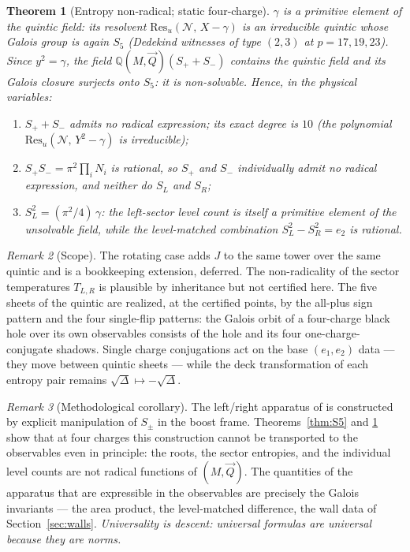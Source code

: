 \documentclass[11pt]{article}
\newtheorem{theorem}{Theorem}[section]
\theoremstyle{definition}
\theoremstyle{remark}
\newtheorem{remark}[theorem]{Remark}
\newcommand{\Q}{\mathbb{Q}}
\newcommand{\disc}{\Delta}
\newcommand{\Res}{\mathrm{Res}}
\begin{document}
\begin{theorem}[Entropy non-radical; static four-charge]
\label{thm:entropy}
$\gamma$ is a primitive element of the quintic field: its resolvent
$\Res_u(\mathcal N,\,X-\gamma)$ is an irreducible quintic whose Galois group
is again $S_5$ (Dedekind witnesses of type $(2,3)$ at $p=17,19,23$). Since
$y^2=\gamma$, the field $\Q(M,\vec Q)(S_++S_-)$ contains the quintic field and
its Galois closure surjects onto $S_5$: it is non-solvable. Hence, in the
physical variables:
\begin{enumerate}
\item $S_++S_-$ admits no radical expression; its exact degree is $10$
(the polynomial $\Res_u(\mathcal N,\,Y^2-\gamma)$ is irreducible);
\item $S_+S_-=\pi^2\prod_iN_i$ is rational, so $S_+$ and $S_-$ individually
admit no radical expression, and neither do $S_L$ and $S_R$;
\item $S_L^2=(\pi^2/4)\,\gamma$: the left-sector level count is itself a
primitive element of the unsolvable field, while the level-matched
combination $S_L^2-S_R^2=e_2$ is rational.
\end{enumerate}
\end{theorem}

\begin{remark}[Scope]
The rotating case adds $J$ to the same tower over the same quintic and is a
bookkeeping extension, deferred. The non-radicality of the sector temperatures
$T_{L,R}$ is plausible by inheritance but not certified here. The five sheets
of the quintic are realized, at the certified points, by the all-plus sign
pattern and the four single-flip patterns: the Galois orbit of a four-charge
black hole over its own observables consists of the hole and its four
one-charge-conjugate shadows. Single charge conjugations act on the base
$(e_1,e_2)$ data --- they move between quintic sheets --- while the deck
transformation of each entropy pair remains
$\sqrt{\disc}\mapsto-\sqrt{\disc}$.
\end{remark}

\begin{remark}[Methodological corollary]
The left/right apparatus of \cite{CL1,CL2,CGLP2018} is constructed by explicit
manipulation of $S_\pm$ in the boost frame. Theorems~\ref{thm:S5} and
\ref{thm:entropy} show that at four charges this construction cannot be
transported to the observables even in principle: the roots, the sector
entropies, and the individual level counts are not radical functions of
$(M,\vec Q)$. The quantities of the apparatus that are expressible in the
observables are precisely the Galois invariants --- the area product, the
level-matched difference, the wall data of Section~\ref{sec:walls}.
\emph{Universality is descent: universal formulas are universal because they
are norms.}
\end{remark}
\end{document}
